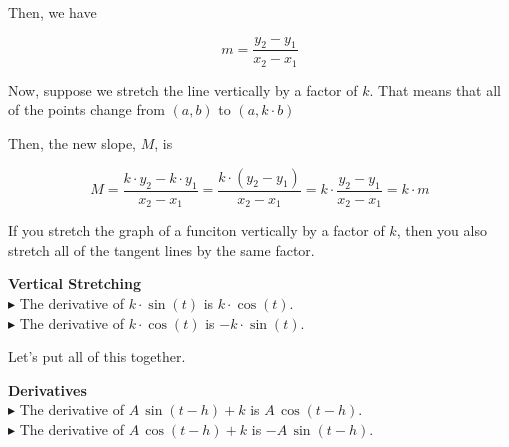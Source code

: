 \documentclass{ximera}
\begin{document}
Then, we have


\[
m = \frac{y_2 - y_1}{x_2 - x_1}
\]






Now, suppose we stretch the line vertically by a factor of $k$.  That means that all of the points change from $(a, b)$ to $(a, k \cdot b)$

Then, the new slope, $M$, is 



\[
M = \frac{k \cdot y_2 - k \cdot y_1}{x_2 - x_1} = \frac{k \cdot (y_2 - y_1)}{x_2 - x_1} = k \cdot \frac{y_2 - y_1}{x_2 - x_1} = k \cdot m
\]


If you stretch the graph of a funciton vertically by a factor of $k$, then you also stretch all of the tangent lines by the same factor.


\begin{observation} \textbf{\textcolor{purple!85!blue}{Vertical Stretching}}   \\

$\blacktriangleright$ The derivative of $k \cdot \sin(t)$ is $k \cdot \cos(t)$. \\

$\blacktriangleright$ The derivative of $k \cdot \cos(t)$ is $-k \cdot \sin(t)$. \\

\end{observation}



Let's put all of this together.







\begin{theorem} \textbf{\textcolor{green!50!black}{Derivatives}}  \\

$\blacktriangleright$ The derivative of \textbf{\textcolor{purple!85!blue}{$A \, \sin(t - h) + k$}} is \textbf{\textcolor{blue!55!black}{$A \, \cos(t - h)$}}. \\

$\blacktriangleright$ The derivative of \textbf{\textcolor{purple!85!blue}{$A \, \cos(t - h) + k$}} is \textbf{\textcolor{blue!55!black}{$-A \, \sin(t - h)$}}. \\

\end{theorem}
\end{document}
